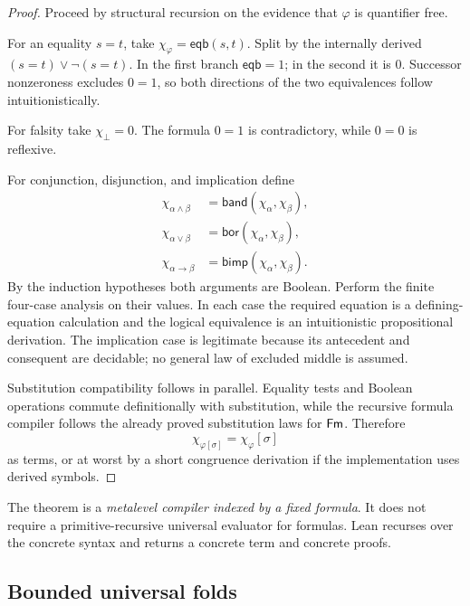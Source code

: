 \begin{proof}
Proceed by structural recursion on the evidence that \(\varphi\) is
quantifier free.

For an equality \(s=t\), take
\(\chi_\varphi=\mathsf{eqb}(s,t)\).  Split by the internally derived
\((s=t)\vee\neg(s=t)\).  In the first branch
\(\mathsf{eqb}=1\); in the second it is \(0\).  Successor nonzeroness excludes
\(0=1\), so both directions of the two equivalences follow
intuitionistically.

For falsity take \(\chi_\bot=0\).  The formula \(0=1\) is contradictory, while
\(0=0\) is reflexive.

For conjunction, disjunction, and implication define
\[
\begin{aligned}
 \chi_{\alpha\wedge\beta}
    &=\mathsf{band}(\chi_\alpha,\chi_\beta),\\
 \chi_{\alpha\vee\beta}
    &=\mathsf{bor}(\chi_\alpha,\chi_\beta),\\
 \chi_{\alpha\to\beta}
    &=\mathsf{bimp}(\chi_\alpha,\chi_\beta).
\end{aligned}
\]
By the induction hypotheses both arguments are Boolean.  Perform the finite
four-case analysis on their values.  In each case the required equation is a
defining-equation calculation and the logical equivalence is an
intuitionistic propositional derivation.  The implication case is legitimate
because its antecedent and consequent are decidable; no general law of
excluded middle is assumed.

Substitution compatibility follows in parallel.  Equality tests and Boolean
operations commute definitionally with substitution, while the recursive
formula compiler follows the already proved substitution laws for
\(\mathsf{Fm}\).  Therefore
\[
    \chi_{\varphi[\sigma]}
      = \chi_\varphi[\sigma]
\]
as terms, or at worst by a short congruence derivation if the implementation
uses derived symbols.
\end{proof}

\begin{remark}
The theorem is a \emph{metalevel compiler indexed by a fixed formula}.  It
does not require a primitive-recursive universal evaluator for formulas.  Lean
recurses over the concrete syntax and returns a concrete term and concrete
proofs.
\end{remark}

\subsection{Bounded universal folds}

